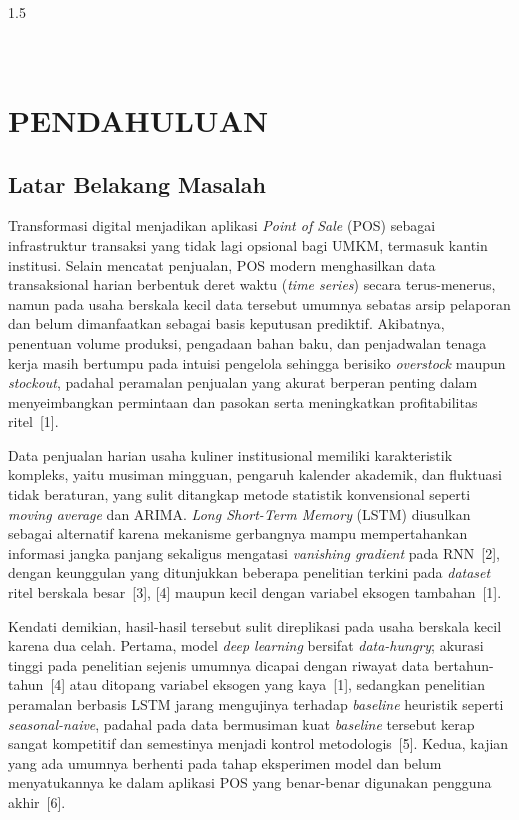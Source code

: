 \documentclass[12pt, a4paper, onecolumn, oneside]{report}
\begin{document}
\begin{spacing}{1.5}

\chapter[PENDAHULUAN]{\\ PENDAHULUAN}

\section{Latar Belakang Masalah}
Transformasi digital menjadikan aplikasi \textit{Point of Sale} (POS) sebagai infrastruktur transaksi yang tidak lagi opsional bagi UMKM, termasuk kantin institusi. Selain mencatat penjualan, POS modern menghasilkan data transaksional harian berbentuk deret waktu (\textit{time series}) secara terus-menerus, namun pada usaha berskala kecil data tersebut umumnya sebatas arsip pelaporan dan belum dimanfaatkan sebagai basis keputusan prediktif. Akibatnya, penentuan volume produksi, pengadaan bahan baku, dan penjadwalan tenaga kerja masih bertumpu pada intuisi pengelola sehingga berisiko \textit{overstock} maupun \textit{stockout}, padahal peramalan penjualan yang akurat berperan penting dalam menyeimbangkan permintaan dan pasokan serta meningkatkan profitabilitas ritel~[1].

Data penjualan harian usaha kuliner institusional memiliki karakteristik kompleks, yaitu musiman mingguan, pengaruh kalender akademik, dan fluktuasi tidak beraturan, yang sulit ditangkap metode statistik konvensional seperti \textit{moving average} dan ARIMA. \textit{Long Short-Term Memory} (LSTM) diusulkan sebagai alternatif karena mekanisme gerbangnya mampu mempertahankan informasi jangka panjang sekaligus mengatasi \textit{vanishing gradient} pada RNN~[2], dengan keunggulan yang ditunjukkan beberapa penelitian terkini pada \textit{dataset} ritel berskala besar~[3], [4] maupun kecil dengan variabel eksogen tambahan~[1].

Kendati demikian, hasil-hasil tersebut sulit direplikasi pada usaha berskala kecil karena dua celah. Pertama, model \textit{deep learning} bersifat \textit{data-hungry}; akurasi tinggi pada penelitian sejenis umumnya dicapai dengan riwayat data bertahun-tahun~[4] atau ditopang variabel eksogen yang kaya~[1], sedangkan penelitian peramalan berbasis LSTM jarang mengujinya terhadap \textit{baseline} heuristik seperti \textit{seasonal-naive}, padahal pada data bermusiman kuat \textit{baseline} tersebut kerap sangat kompetitif dan semestinya menjadi kontrol metodologis~[5]. Kedua, kajian yang ada umumnya berhenti pada tahap eksperimen model dan belum menyatukannya ke dalam aplikasi POS yang benar-benar digunakan pengguna akhir~[6].


\end{spacing}
\end{document}
